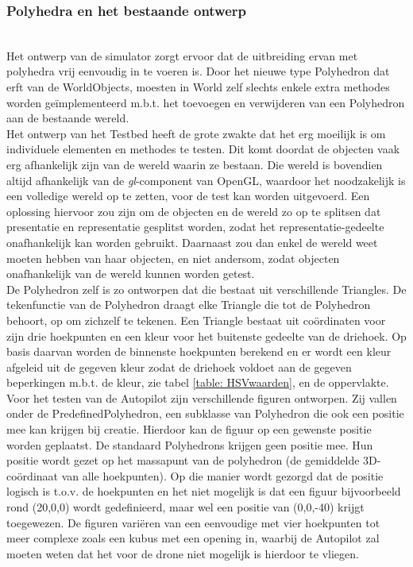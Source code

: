 \subsubsection{Polyhedra en het bestaande ontwerp}
\\
Het ontwerp van de simulator zorgt ervoor dat de uitbreiding ervan met polyhedra vrij eenvoudig in te voeren is. Door het nieuwe type Polyhedron dat erft van de WorldObjects, moesten in World zelf slechts enkele extra methodes worden ge\"implementeerd m.b.t. het toevoegen en verwijderen van een Polyhedron aan de bestaande wereld.\\
\noindent
Het ontwerp van het Testbed heeft de grote zwakte dat het erg moeilijk is om individuele elementen en methodes te testen. Dit komt doordat de objecten vaak erg afhankelijk zijn van de wereld waarin ze bestaan. Die wereld is bovendien altijd afhankelijk van de \textit{gl}-component van OpenGL, waardoor het noodzakelijk is een volledige wereld op te zetten, voor de test kan worden uitgevoerd. Een oplossing hiervoor zou zijn om de objecten en de wereld zo op te splitsen dat presentatie en representatie gesplitst worden, zodat het representatie-gedeelte onafhankelijk kan worden gebruikt. Daarnaast zou dan enkel de wereld weet moeten hebben van haar objecten, en niet andersom, zodat objecten onafhankelijk van de wereld kunnen worden getest.\\

\noindent 
De Polyhedron zelf is zo ontworpen dat die bestaat uit verschillende Triangles. De tekenfunctie van de Polyhedron draagt elke Triangle die tot de Polyhedron behoort, op om zichzelf te tekenen. Een Triangle bestaat uit co\"ordinaten voor zijn drie hoekpunten en een kleur voor het buitenste gedeelte van de driehoek. Op basis daarvan worden de binnenste hoekpunten berekend en er wordt een kleur afgeleid uit de gegeven kleur zodat de driehoek voldoet aan de gegeven beperkingen m.b.t. de kleur, zie tabel \ref{table: HSVwaarden}, en de oppervlakte.\\
\noindent
Voor het testen van de Autopilot zijn verschillende figuren ontworpen. Zij vallen onder de PredefinedPolyhedron, een subklasse van Polyhedron die ook een positie mee kan krijgen bij creatie. Hierdoor kan de figuur op een gewenste positie worden geplaatst. De standaard Polyhedrons krijgen geen positie mee. Hun positie wordt gezet op het massapunt van de polyhedron (de gemiddelde 3D-co\"ordinaat van alle hoekpunten). Op die manier wordt gezorgd dat de positie logisch is t.o.v. de hoekpunten en het niet mogelijk is dat een figuur bijvoorbeeld rond (20,0,0) wordt gedefinieerd, maar wel een positie van (0,0,-40) krijgt toegewezen. De figuren vari\"eren van een eenvoudige met vier hoekpunten tot meer complexe zoals een kubus met een opening in, waarbij de Autopilot zal moeten weten dat het voor de drone niet mogelijk is hierdoor te vliegen.

